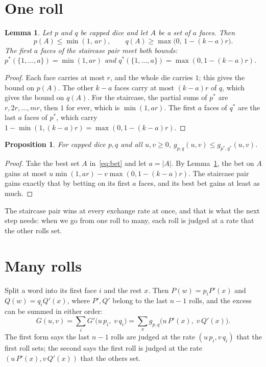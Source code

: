 \documentclass[11pt]{article}
\newtheorem{proposition}{Proposition}
\newtheorem{lemma}{Lemma}
\theoremstyle{remark}
\begin{document}
\section{One roll}

\begin{lemma}\label{lem:sets}
Let $p$ and $q$ be capped dice and let $A$ be a set of $a$ faces. Then
\[
p(A)\le\min(1,\,ar),\qquad q(A)\ge\max\bigl(0,\,1-(k-a)r\bigr).
\]
The first $a$ faces of the staircase pair meet both bounds: $p^*(\{1,\dots,a\})=\min(1,ar)$ and
$q^*(\{1,\dots,a\})=\max(0,1-(k-a)r)$.
\end{lemma}

\begin{proof}
Each face carries at most $r$, and the whole die carries $1$; this gives the bound on $p(A)$. The other
$k-a$ faces carry at most $(k-a)r$ of $q$, which gives the bound on $q(A)$. For the staircase, the partial sums
of $p^*$ are $r,2r,\dots,mr$, then $1$ for ever, which is $\min(1,ar)$. The first $a$ faces of $q^*$ are the
last $a$ faces of $p^*$, which carry $1-\min(1,(k-a)r)=\max(0,1-(k-a)r)$.
\end{proof}

\begin{proposition}\label{prop:one}
For capped dice $p,q$ and all $u,v\ge0$, $g_{p,q}(u,v)\le g_{p^*,q^*}(u,v)$.
\end{proposition}

\begin{proof}
Take the best set $A$ in~\eqref{eq:bet} and let $a=|A|$. By Lemma~\ref{lem:sets}, the bet on $A$ gains at most
$u\min(1,ar)-v\max(0,1-(k-a)r)$. The staircase pair gains exactly that by betting on its first $a$ faces, and
its best bet gains at least as much.
\end{proof}

The staircase pair wins at every exchange rate at once, and that is what the next step needs: when we go from
one roll to many, each roll is judged at a rate that the other rolls set.

\section{Many rolls}

Split a word into its first face $i$ and the rest $x$. Then $P(w)=p_i P'(x)$ and $Q(w)=q_i Q'(x)$, where
$P',Q'$ belong to the last $n-1$ rolls, and the excess can be summed in either order:
\begin{equation}\label{eq:split}
G(u,v)=\sum_i G'\bigl(u\,p_i,\;v\,q_i\bigr)=\sum_x g_{p,q}\bigl(u\,P'(x),\;v\,Q'(x)\bigr).
\end{equation}
The first form says the last $n-1$ rolls are judged at the rate $(u\,p_i,v\,q_i)$ that the first roll
sets; the second says the first roll is judged at the rate $(u\,P'(x),v\,Q'(x))$ that the others set.
\end{document}
